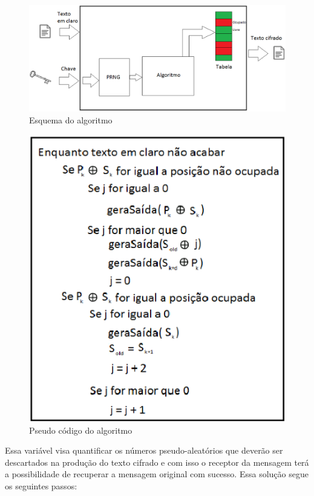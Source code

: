 \begin{figure}[h]
	\centering
	\includegraphics[scale=0.6]{figuras/funcionamento.eps}
	\caption{Esquema do algoritmo}
\end{figure}


\begin{figure}[h]
	\centering
	\includegraphics[scale=0.9]{figuras/pseudocondigo.eps}
	\caption{Pseudo código do algoritmo}
\end{figure}

Essa variável visa quantificar os números pseudo-aleatórios que deverão ser descartados na produção do texto cifrado e com isso o receptor da mensagem terá a possibilidade de recuperar a mensagem original com sucesso. Essa solução segue os seguintes passos:

